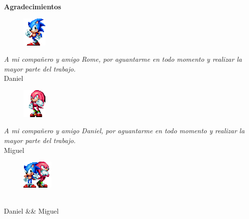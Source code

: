 \newpage
\begin{center}
{\bf \Huge Agradecimientos}
\end{center}
\vspace{1cm}
\setlength{\baselineskip}{0.8cm}

\begin{figure}[H]
	\raggedleft
  	\includegraphics[width=12mm]{pics/sonic_.png}
\end{figure}

\begin{flushright}
\textit{A mi compañero y amigo Rome, por aguantarme en todo momento y realizar la mayor parte del trabajo.}\\
Daniel\\
\vspace{0.5cm}


\begin{figure}[H]
	\raggedleft
  	\includegraphics[width=12mm]{pics/knuckles.png}
\end{figure}

\textit{A mi compañero y amigo Daniel, por aguantarme en todo momento y realizar la mayor parte del trabajo.}\\
Miguel\\
\vspace{0.5cm}

\begin{figure}[H]
	\raggedleft
  	\includegraphics[width=15mm]{pics/both.png}
\end{figure}

\textit{}\\
Daniel \&\& Miguel\\
\vspace{0.5cm}


\end{flushright}


